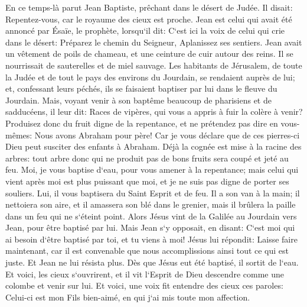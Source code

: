\verse En ce temps-là parut Jean Baptiste, prêchant dans le désert de Judée. 
\verse Il disait: Repentez-vous, car le royaume des cieux est proche. 
\verse Jean est celui qui avait été annoncé par Ésaïe, le prophète, lorsqu`il dit: C`est ici la voix de celui qui crie dans le désert: Préparez le chemin du Seigneur, Aplanissez ses sentiers. 
\verse Jean avait un vêtement de poils de chameau, et une ceinture de cuir autour des reins. Il se nourrissait de sauterelles et de miel sauvage. 
\verse Les habitants de Jérusalem, de toute la Judée et de tout le pays des environs du Jourdain, se rendaient auprès de lui; 
\verse et, confessant leurs péchés, ils se faisaient baptiser par lui dans le fleuve du Jourdain. 
\verse Mais, voyant venir à son baptême beaucoup de pharisiens et de sadducéens, il leur dit: Races de vipères, qui vous a appris à fuir la colère à venir? 
\verse Produisez donc du fruit digne de la repentance, 
\verse et ne prétendez pas dire en vous-mêmes: Nous avons Abraham pour père! Car je vous déclare que de ces pierres-ci Dieu peut susciter des enfants à Abraham. 
\verse Déjà la cognée est mise à la racine des arbres: tout arbre donc qui ne produit pas de bons fruits sera coupé et jeté au feu. 
\verse Moi, je vous baptise d`eau, pour vous amener à la repentance; mais celui qui vient après moi est plus puissant que moi, et je ne suis pas digne de porter ses souliers. Lui, il vous baptisera du Saint Esprit et de feu. 
\verse Il a son van à la main; il nettoiera son aire, et il amassera son blé dans le grenier, mais il brûlera la paille dans un feu qui ne s`éteint point. 
\verse Alors Jésus vint de la Galilée au Jourdain vers Jean, pour être baptisé par lui. 
\verse Mais Jean s`y opposait, en disant: C`est moi qui ai besoin d`être baptisé par toi, et tu viens à moi! 
\verse Jésus lui répondit: Laisse faire maintenant, car il est convenable que nous accomplissions ainsi tout ce qui est juste. Et Jean ne lui résista plus. 
\verse Dès que Jésus eut été baptisé, il sortit de l`eau. Et voici, les cieux s`ouvrirent, et il vit l`Esprit de Dieu descendre comme une colombe et venir sur lui. 
\verse Et voici, une voix fit entendre des cieux ces paroles: Celui-ci est mon Fils bien-aimé, en qui j`ai mis toute mon affection. 

\chapter{}

